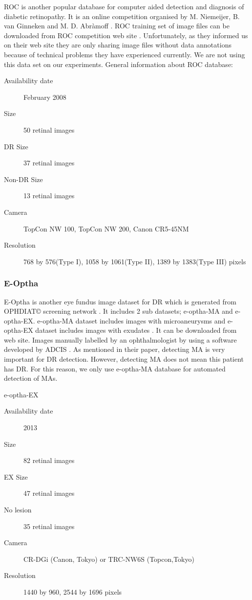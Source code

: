 ROC is another popular database for computer aided detection and diagnosis of diabetic retinopathy. It is an online competition organised by M. Niemeijer, B. van Ginneken and M. D. Abràmoff \citep{niemeijer2010retinopathy}. ROC training set of image files can be downloaded from ROC competition web site \citep{ROC}.   Unfortunately, as they informed us on their web site \citet{ROC} they are only sharing image files without data annotations because of technical problems they have experienced currently. We are not using this data set on our experiments.
General information about ROC database:
\begin{description}
    \item[Availability date] February 2008
    \item[Size] 50 retinal images
    \item[DR Size] 37 retinal images
    \item[Non-DR Size] 13 retinal images
    \item[Camera] TopCon NW 100, TopCon NW 200, Canon CR5-45NM
    \item[Resolution] 768 by 576(Type I), 1058 by 1061(Type II), 1389 by 1383(Type III) pixels
\end{description}

\subsubsection{E-Optha}

E-Optha is another eye fundus image dataset for DR which is generated from OPHDIAT© screening network \citep{massin2008ophdiat}. It includes 2 sub datasets; e-optha-MA and e-optha-EX. e-optha-MA dataset includes images with microaneurysms and e-optha-EX dataset includes images with exudates . It can be downloaded from  \citet{E-Optha} web site. Images manually labelled by an ophthalmologist by using a software developed by ADCIS \citep{decenciere2013teleophta}. As \citet{niemeijer2010retinopathy} mentioned in their paper, detecting MA is very important for DR detection. However, detecting MA does not mean this patient has DR. For this reason, we only use e-optha-MA database for automated detection of MAs. 

e-optha-EX
\begin{description}
    \item[Availability date] 2013
    \item[Size] 82 retinal images
    \item[EX Size] 47 retinal images
    \item[No lesion] 35 retinal images
    \item[Camera] CR-DGi (Canon, Tokyo) or TRC-NW6S (Topcon,Tokyo) \citep{quellec2012multiple}
    \item[Resolution] 1440 by 960, 2544 by 1696 pixels
\end{description}

